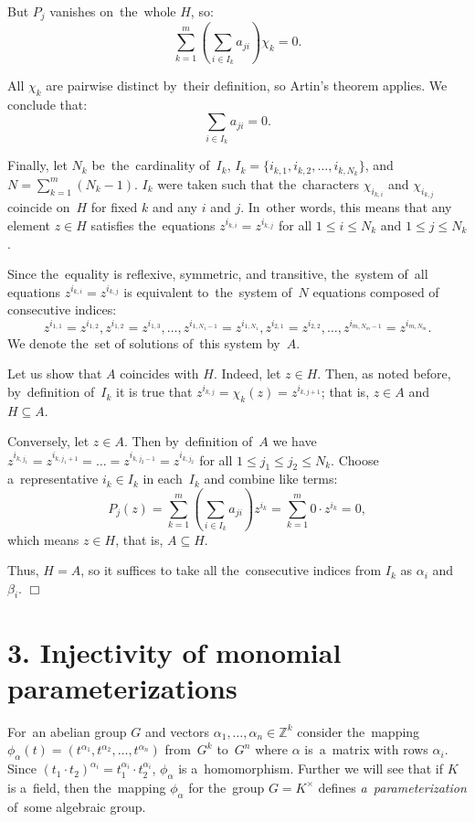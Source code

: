 \documentclass[twoside]{article}
\begin{document}
    But $P_j$ vanishes on~the~whole $H$, so:
    $$
        \sum_{k = 1}^{m} \left( \sum_{i \in I_k} a_{ji} \right) \chi_k = 0.
    $$

    All $\chi_k$ are pairwise distinct by~their definition, so Artin's theorem applies. We conclude that:
    $$
    \sum_{i \in I_k} a_{ji} = 0.
    $$

    Finally, let $N_k$ be~the~cardinality of~$I_k$, $I_k = \{i_{k, 1}, i_{k, 2}, \ldots, i_{k, N_k}\}$, and $N = \sum_{k = 1}^m (N_k - 1)$.
    $I_k$ were taken such that the~characters $\chi_{i_{k, i}}$ and $\chi_{i_{k, j}}$ coincide on~$H$ for fixed $k$ and any $i$ and $j$.
    In~other words, this means that any element $z \in H$ satisfies the~equations $z^{i_{k, i}} = z^{i_{k, j}}$ for all $1 \leq i \leq N_k$
    and $1 \leq j \leq N_k$.

    Since the~equality is reflexive, symmetric, and transitive, the~system of~all equations $z^{i_{k, i}} = z^{i_{k, j}}$
    is equivalent to~the~system of~$N$ equations composed of consecutive indices:
    $$
        z^{i_{1, 1}} = z^{i_{1, 2}}, z^{i_{1, 2}} = z^{i_{1, 3}}, \ldots, z^{i_{1, N_1 - 1}} = z^{i_{1, N_1}}, z^{i_{2, 1}} = z^{i_{2, 2}}, \ldots, z^{i_{m, N_m - 1}} = z^{i_{m, N_m}}.
    $$
    We denote the~set of solutions of~this system by~$A$.

    Let us show that $A$ coincides with $H$. Indeed, let $z \in H$. Then, as noted before,
    by~definition of~$I_k$ it is true that $z^{i_{k, j}} = \chi_k(z) = z^{i_{k, j + 1}}$;
    that is, $z \in A$ and $H \subseteq A$.

    Conversely, let $z \in A$. Then by~definition of~$A$ we have $z^{i_{k, j_1}} = z^{i_{k, j_1 + 1}} = \ldots = z^{i_{k, j_2 - 1}} = z^{i_{k, j_2}}$
    for all $1 \leq j_1 \leq j_2 \leq N_k$. Choose a~representative $i_k \in I_k$ in each~$I_k$
    and combine like terms:
    $$
        P_j(z) = \sum_{k = 1}^{m} \left( \sum_{i \in I_k} a_{ji} \right) z^{i_k} = \sum_{k = 1}^{m} 0 \cdot z^{i_k} = 0,
    $$
    which means $z \in H$, that is, $A \subseteq H$.

    Thus, $H = A$, so it suffices to take all the~consecutive indices from $I_k$ as $\alpha_i$ and $\beta_i$.
\hfill$\Box$\medskip

\section*{3. Injectivity of monomial parameterizations}

For~an abelian group $G$ and vectors $\alpha_1, \ldots, \alpha_n \in \mathbb{Z}^k$ consider the~mapping
$\phi_\alpha(t) = (t^{\alpha_1}, t^{\alpha_2}, \ldots, t^{\alpha_n})$ from~$G^k$ to~$G^n$ where $\alpha$ is~a~matrix
with rows $\alpha_i$. Since $(t_1 \cdot t_2)^{\alpha_i} = t_1^{\alpha_i} \cdot t_2^{\alpha_i}$,
$\phi_\alpha$ is a~homomorphism. Further we will see that if $K$ is a~field, then the~mapping $\phi_\alpha$
for the~group $G = K^\times$ defines \textit{a~parameterization} of~some algebraic group.
\end{document}
